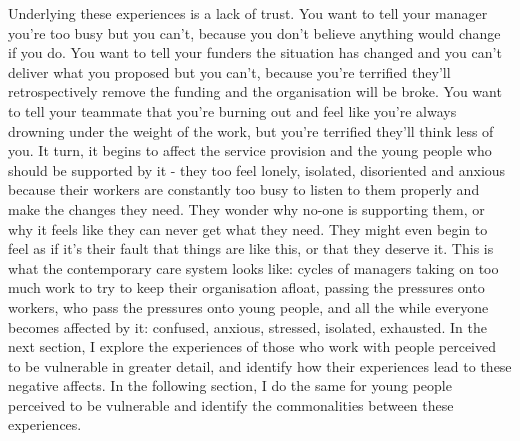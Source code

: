 Underlying these experiences is a lack of trust. You want to tell your manager you’re too busy but you can’t, because you don’t believe anything would change if you do. You want to tell your funders the situation has changed and you can’t deliver what you proposed but you can’t, because you’re terrified they’ll retrospectively remove the funding and the organisation will be broke. You want to tell your teammate that you’re burning out and feel like you’re always drowning under the weight of the work, but you’re terrified they’ll think less of you. It turn, it begins to affect the service provision and the young people who should be supported by it - they too feel lonely, isolated, disoriented and anxious because their workers are constantly too busy to listen to them properly and make the changes they need. They wonder why no-one is supporting them, or why it feels like they can never get what they need. They might even begin to feel as if it’s their fault that things are like this, or that they deserve it. This is what the contemporary care system looks like: cycles of managers taking on too much work to try to keep their organisation afloat, passing the pressures onto workers, who pass the pressures onto young people, and all the while everyone becomes affected by it: confused, anxious, stressed, isolated, exhausted. In the next section, I explore the experiences of those who work with people perceived to be vulnerable in greater detail, and identify how their experiences lead to these negative affects. In the following section, I do the same for young people perceived to be vulnerable and identify the commonalities between these experiences. 

